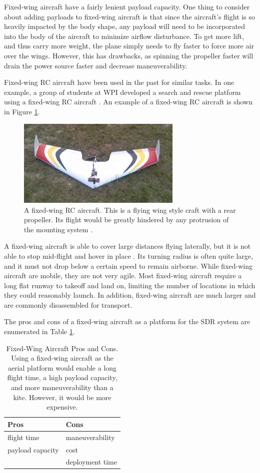 Fixed-wing aircraft have a fairly lenient payload capacity. One thing to consider about adding payloads to fixed-wing aircraft is that since the aircraft’s flight is so heavily impacted by the body shape, any payload will need to be incorporated into the body of the aircraft to minimize airflow disturbance. To get more lift, and thus carry more weight, the plane simply needs to fly faster to force more air over the wings. However, this has drawbacks, as spinning the propeller faster will drain the power source faster and decrease maneuverability.\par
Fixed-wing RC aircraft have been used in the past for similar tasks. In one example, a group of students at WPI developed a search and rescue platform using a fixed-wing RC aircraft \cite{airplane_iqp}. An example of a fixed-wing RC aircraft is shown in Figure \ref{fig:fixed_wing}.
\begin{figure}[ht]
\centering
\includegraphics[width=0.70\textwidth]{img/fixed-wing.jpg}
\caption{A fixed-wing RC aircraft. This is a flying wing style craft with a rear propeller. Its flight would be greatly hindered by any protrusion of the mounting system \cite{airplane_iqp}.}
\label{fig:fixed_wing}
\end{figure}\par
A fixed-wing aircraft is able to cover large distances flying laterally, but it is not able to stop mid-flight and hover in place \cite{airplane_book}. Its turning radius is often quite large, and it must not drop below a certain speed to remain airborne. While fixed-wing aircraft are mobile, they are not very agile. Most fixed-wing aircraft require a long flat runway to takeoff and land on, limiting the number of locations in which they could reasonably launch. In addition, fixed-wing aircraft are much larger and are commonly disassembled for transport.\par
The pros and cons of a fixed-wing aircraft as a platform for the SDR system are enumerated in Table \ref{table:wing_pc}.
\begin{table}[ht]
\centering
\caption{Fixed-Wing Aircraft Pros and Cons. Using a fixed-wing aircraft as the aerial platform would enable a long flight time, a high payload capacity, and more maneuverability than a kite. However, it would be more expensive.}
\label{table:wing_pc}
\begin{tabular}{l|l}
  Pros & Cons \\ \hline
  flight time & maneuverability \\
  payload capacity & cost \\
   & deployment time \\
\end{tabular}
\end{table}\par

